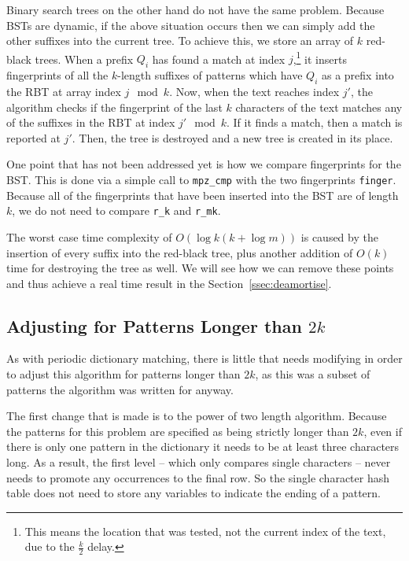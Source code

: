 \documentclass[ %
                    author={Dominic Joseph Moylett},
                    degree={MEng},
                     title={Dictionary Matching with Fingerprints},
                  subtitle={An Empirical Analysis},
                      type={research},
                      year={2015} ]{dissertation}
\begin{document}
Binary search trees on the other hand do not have the same problem. Because BSTs are dynamic, if the above situation occurs then we can simply add the other suffixes into the current tree. To achieve this, we store an array of $k$ red-black trees. When a prefix $Q_i$ has found a match at index $j$,\footnote{This means the location that was tested, not the current index of the text, due to the $\frac{k}{2}$ delay.} it inserts fingerprints of all the $k$-length suffixes of patterns which have $Q_i$ as a prefix into the RBT at array index $j \mod k$. Now, when the text reaches index $j'$, the algorithm checks if the fingerprint of the last $k$ characters of the text matches any of the suffixes in the RBT at index $j' \mod k$. If it finds a match, then a match is reported at $j'$. Then, the tree is destroyed and a new tree is created in its place.

One point that has not been addressed yet is how we compare fingerprints for the BST. This is done via a simple call to \texttt{mpz\_cmp} with the two fingerprints \texttt{finger}. Because all of the fingerprints that have been inserted into the BST are of length $k$, we do not need to compare \texttt{r\_k} and \texttt{r\_mk}.

The worst case time complexity of $O(\log k(k + \log m))$ is caused by the insertion of every suffix into the red-black tree, plus another addition of $O(k)$ time for destroying the tree as well. We will see how we can remove these points and thus achieve a real time result in the Section~\ref{ssec:deamortise}.

\subsection{Adjusting for Patterns Longer than $2k$}

As with periodic dictionary matching, there is little that needs modifying in order to adjust this algorithm for patterns longer than $2k$, as this was a subset of patterns the algorithm was written for anyway.

The first change that is made is to the power of two length algorithm. Because the patterns for this problem are specified as being strictly longer than $2k$, even if there is only one pattern in the dictionary it needs to be at least three characters long. As a result, the first level -- which only compares single characters -- never needs to promote any occurrences to the final row. So the single character hash table does not need to store any variables to indicate the ending of a pattern.
\end{document}
